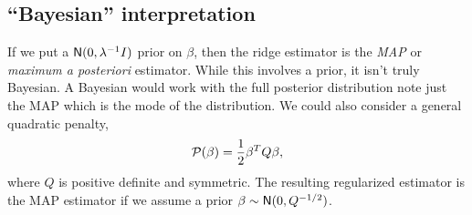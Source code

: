 \subsection{``Bayesian'' interpretation}
If we put a $\mathsf{N}(0,\lambda^{-1}I)$ prior on $\beta$, then the ridge estimator is the \emph{MAP} or \emph{maximum a posteriori} estimator. While this involves a prior, it isn't truly Bayesian. A Bayesian would work with the full posterior distribution note just the MAP which is the mode of the distribution. We could also consider a general quadratic penalty,
\[{\mathcal{P}}(\beta) = \frac{1}{2}\beta^TQ \beta, \]
where $Q$ is positive definite and symmetric. The resulting regularized estimator is the MAP estimator if we assume a prior $\beta \sim \mathsf{N}(0,Q^{-1/2})$. 
